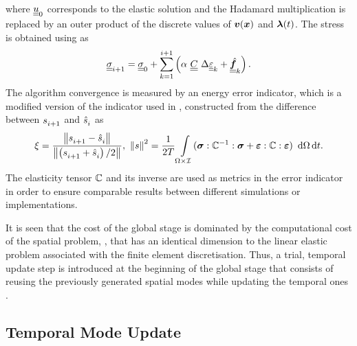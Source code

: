 where $\underline{\underline{u}}_0$ corresponds to the elastic solution and the Hadamard multiplication is replaced by an outer product of the discrete values of ${\mbox{$\bm  v$}}(\mbox{$\bm  x$})$ and $\mbox{$\bm \lambda$}(t)$. The stress is obtained using  as
\begin{equation}
	\stepk{\msigma} = {\msigma}_0 + \sum_{k=1}^{i+1} \left( \alpha \contraction \mC \contraction \Delta{\meps}_k + \mat{\fhf}_k \right).
	\label{eqstresscorrection}
\end{equation}
The algorithm convergence is measured by an energy error indicator, which is a modified version of the indicator used in \parencite{bhattacharyya2018model}, constructed from the difference between $s_{i+1}^{{\rm{}}}$ and $\hat{s}_{i}^{{\rm{}}}$ as
\begin{equation}
	\xi =\frac{\normg{\stepk[]{s}-\stepj[]{s}}{}}{\normg{ \left(\stepk[]{s} + \stepj[]{s}\right)/2}{}}{} , \
	\normg{s}{}^2 = \frac{1}{2T} \intST (\fsigma \dcontraction \ffC^{-1} \dcontraction \fsigma + \feps \dcontraction \ffC \dcontraction \feps )\contraction\d \Omega \d t.
	\label{eq_error_indicator}
\end{equation}
The elasticity tensor ${\mathbb{ C}}$ and its inverse are used as metrics in the error indicator in order to ensure comparable results between different simulations or implementations.

It is seen that the cost of the global stage is dominated by the computational cost of the spatial problem, , that has an identical dimension to the linear elastic problem associated with the finite element discretisation. Thus, a trial, temporal update step is introduced at the beginning of the global stage that consists of reusing the previously generated spatial modes while updating the temporal ones \parencite{bhattacharyya2018model}.

\subsection{Temporal Mode Update}
\label{sec_time_update}

